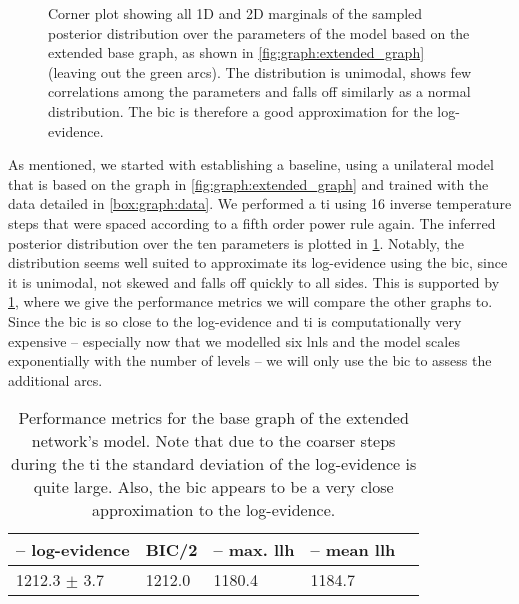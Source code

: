 \documentclass[\relativeRoot/main.tex]{subfiles}
\begin{document}
\begin{figure}
    \centering
    \def\svgwidth{1.04\textwidth}
    
    \caption[
        Corner plot displaying the posterior over parameters for the extended base graph
    ]{
        Corner plot showing all 1D and 2D marginals of the sampled posterior distribution over the parameters of the model based on the extended base graph, as shown in \cref{fig:graph:extended_graph} (leaving out the green arcs). The distribution is unimodal, shows few correlations among the parameters and falls off similarly as a normal distribution. The \gls{bic} is therefore a good approximation for the log-evidence.
    }
    \label{fig:graph:extended:base:corner}
\end{figure}

As mentioned, we started with establishing a baseline, using a unilateral model that is based on the graph in \cref{fig:graph:extended_graph} and trained with the data detailed in \cref{box:graph:data}. We performed a \gls{ti} using 16 inverse temperature steps that were spaced according to a fifth order power rule again. The inferred posterior distribution over the ten parameters is plotted in \cref{fig:graph:extended:base:corner}. Notably, the distribution seems well suited to approximate its log-evidence using the \gls{bic}, since it is unimodal, not skewed and falls off quickly to all sides. This is supported by \cref{table:graph:extended:base}, where we give the performance metrics we will compare the other graphs to. Since the \gls{bic} is so close to the log-evidence and \gls{ti} is computationally very expensive -- especially now that we modelled six \glspl{lnl} and the model scales exponentially with the number of levels -- we will only use the \gls{bic} to assess the additional arcs.

\begin{table}
    \centering
    \begin{tabular}{|l|l|l|l|l|}
        \hline
        \textbf{-- log-evidence} & \textbf{BIC/2} & \textbf{-- max. llh} & \textbf{-- mean llh} \\
        \hline
        1212.3 $\pm$ 3.7 & 1212.0 & 1180.4 & 1184.7 \\ 
        \hline
    \end{tabular}
    \caption[
        Performance of the extended base graph
    ]{
        Performance metrics for the base graph of the extended network's model. Note that due to the coarser steps during the \acrlong{ti} the standard deviation of the log-evidence is quite large. Also, the \gls{bic} appears to be a very close approximation to the log-evidence.
    }
    \label{table:graph:extended:base}
\end{table}
\end{document}
